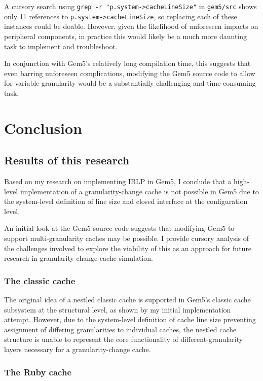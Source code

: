 \documentclass[12pt,twoside]{reedthesis}
\begin{document}
	A cursory search using \verb`grep -r "p.system->cacheLineSize"` in \verb`gem5/src` shows only 11 references to \verb`p.system->cacheLineSize`, so replacing each of these instances could be doable. However, given the likelihood of unforeseen impacts on peripheral components, in practice this would likely be a much more daunting task to implement and troubleshoot.
	
	In conjunction with Gem5's relatively long compilation time, this suggests that even barring unforeseen complications, modifying the Gem5 source code to allow for variable granularity would be a substantially challenging and time-consuming task.

\chapter{Conclusion}

\section{Results of this research}

	Based on my research on implementing IBLP in Gem5, I conclude that a high-level implementation of a granularity-change cache is not possible in Gem5 due to the system-level definition of line size and closed interface at the configuration level.
	
	An initial look at the Gem5 source code suggests that modifying Gem5 to support multi-granularity caches may be possible. I provide cursory analysis of the challenges involved to explore the viability of this as an approach for future research in granularity-change cache simulation.

	\subsection*{The classic cache}

	The original idea of a nestled classic cache is supported in Gem5's classic cache subsystem at the structural level, as shown by my initial implementation attempt. However, due to the system-level definition of cache line size preventing assignment of differing granularities to individual caches, the nestled cache structure is unable to represent the core functionality of different-granularity layers necessary for a granularity-change cache.

	\subsection*{The Ruby cache}
\end{document}
